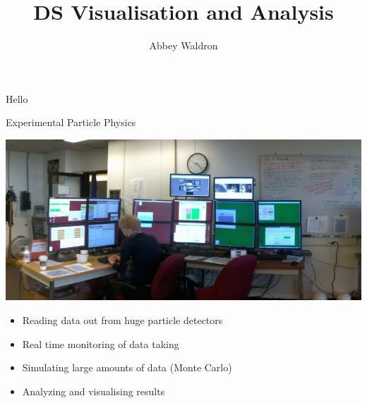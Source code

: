 \documentclass{beamer}
\newif\ifplacelogo
\begin{document}
\setlength{\unitlength}{1mm}
\title{DS Visualisation and Analysis}
\author[Abbey Waldron]{Abbey Waldron}
\date[September 4th, 2015]{}





{
\placelogofalse
\begin{frame}
  \titlepage
\end{frame}
}



\begin{frame}{Hello}

\end{frame}


\begin{frame}{Experimental Particle Physics}
  \begin{center}
    \includegraphics[scale=0.3]{pics/control_room.jpg}
  \end{center}
\begin{itemize}
\item Reading data out from huge particle detectors
\item Real time monitoring of data taking
\item Simulating large amounts of data (Monte Carlo)
\item Analyzing and visualising results 
\end{itemize}

\end{frame}
\end{document}
